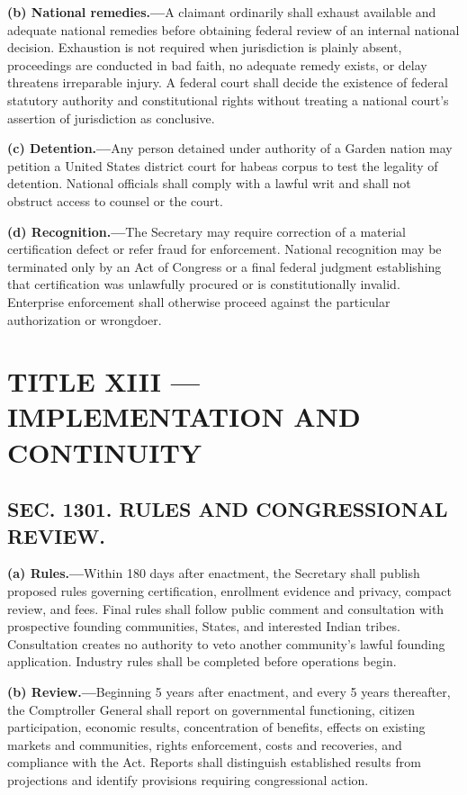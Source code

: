 \documentclass[12pt,letterpaper]{article}
\begin{document}
\textbf{(b) National remedies.---}A claimant ordinarily shall exhaust available and adequate national remedies before obtaining federal review of an internal national decision. Exhaustion is not required when jurisdiction is plainly absent, proceedings are conducted in bad faith, no adequate remedy exists, or delay threatens irreparable injury. A federal court shall decide the existence of federal statutory authority and constitutional rights without treating a national court's assertion of jurisdiction as conclusive.

\textbf{(c) Detention.---}Any person detained under authority of a Garden nation may petition a United States district court for habeas corpus to test the legality of detention. National officials shall comply with a lawful writ and shall not obstruct access to counsel or the court.

\textbf{(d) Recognition.---}The Secretary may require correction of a material certification defect or refer fraud for enforcement. National recognition may be terminated only by an Act of Congress or a final federal judgment establishing that certification was unlawfully procured or is constitutionally invalid. Enterprise enforcement shall otherwise proceed against the particular authorization or wrongdoer.

\section*{TITLE XIII --- IMPLEMENTATION AND CONTINUITY}

\subsection*{SEC. 1301. RULES AND CONGRESSIONAL REVIEW.}

\textbf{(a) Rules.---}Within 180 days after enactment, the Secretary shall publish proposed rules governing certification, enrollment evidence and privacy, compact review, and fees. Final rules shall follow public comment and consultation with prospective founding communities, States, and interested Indian tribes. Consultation creates no authority to veto another community's lawful founding application. Industry rules shall be completed before operations begin.

\textbf{(b) Review.---}Beginning 5 years after enactment, and every 5 years thereafter, the Comptroller General shall report on governmental functioning, citizen participation, economic results, concentration of benefits, effects on existing markets and communities, rights enforcement, costs and recoveries, and compliance with the Act. Reports shall distinguish established results from projections and identify provisions requiring congressional action.
\end{document}
